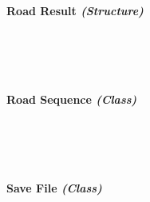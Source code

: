 \begin{FlushLeft}
\begin{enumerate}
    \bk

    \paragraph{Road Result \textit{(Structure)}} \mbox{} \\

    \begin{figure}[H]
        \centering
    \end{figure}\\

    \bk

    \paragraph{Road Sequence \textit{(Class)}} \mbox{} \\

    \begin{figure}[H]
        \centering
    \end{figure}\\

    \bk

    
    \paragraph{Save File \textit{(Class)}} \mbox{} \\


\end{enumerate}
\end{FlushLeft}
